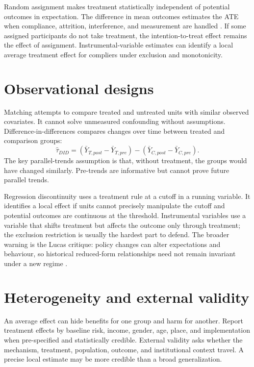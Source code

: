 \documentclass[11pt,oneside,openany]{book}
\begin{document}
Random assignment makes treatment statistically independent of potential outcomes in expectation. The difference in mean outcomes estimates the ATE when compliance, attrition, interference, and measurement are handled \cite{imbensrubin2015}. If some assigned participants do not take treatment, the intention-to-treat effect remains the effect of assignment. Instrumental-variable estimates can identify a local average treatment effect for compliers under exclusion and monotonicity.

\section{Observational designs}

Matching attempts to compare treated and untreated units with similar observed covariates. It cannot solve unmeasured confounding without assumptions. Difference-in-differences compares changes over time between treated and comparison groups:
\[
  \widehat{\tau}_{DID}=(\bar{Y}_{T,post}-\bar{Y}_{T,pre})-(\bar{Y}_{C,post}-\bar{Y}_{C,pre}).
\]
The key parallel-trends assumption is that, without treatment, the groups would have changed similarly. Pre-trends are informative but cannot prove future parallel trends.

Regression discontinuity uses a treatment rule at a cutoff in a running variable. It identifies a local effect if units cannot precisely manipulate the cutoff and potential outcomes are continuous at the threshold. Instrumental variables use a variable that shifts treatment but affects the outcome only through treatment; the exclusion restriction is usually the hardest part to defend. The broader warning is the Lucas critique: policy changes can alter expectations and behaviour, so historical reduced-form relationships need not remain invariant under a new regime \cite{lucas1976}.

\section{Heterogeneity and external validity}

An average effect can hide benefits for one group and harm for another. Report treatment effects by baseline risk, income, gender, age, place, and implementation when pre-specified and statistically credible. External validity asks whether the mechanism, treatment, population, outcome, and institutional context travel. A precise local estimate may be more credible than a broad generalization.
\end{document}
